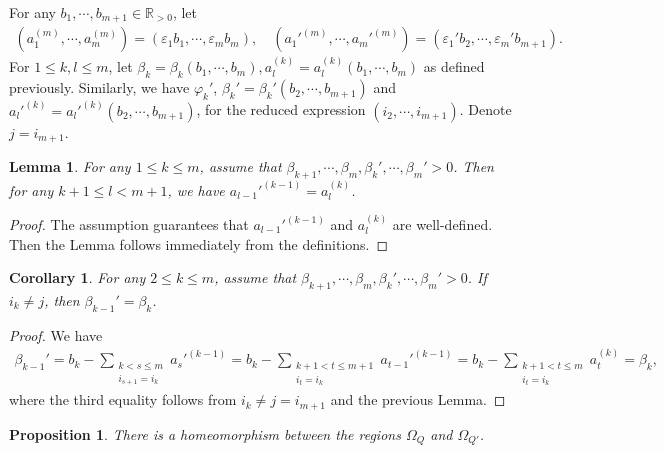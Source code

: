 \documentclass[12pt]{amsart}
\newtheorem{lemma}[theorem]{Lemma}
\newtheorem{corollary}[theorem]{Corollary}
\newtheorem{proposition}[theorem]{Proposition}
\begin{document}
For any $b_1,\cdots,b_{m+1}\in \mathbb{R}_{>0}$, let 
\begin{align*}
    (a_1^{(m)},\cdots,a_m^{(m)})=(\varepsilon_1b_1,\cdots,\varepsilon_mb_m), \quad ({a_1'}^{(m)},\cdots,{a_m'}^{(m)})=(\varepsilon_1'b_2,\cdots,\varepsilon_m'b_{m+1}).
\end{align*}
For $1\leq k,l\leq m$, let $\beta_k=\beta_k(b_1,\cdots,b_m),a_l^{(k)}=a_l^{(k)}(b_1,\cdots,b_m)$ as defined previously.
Similarly, we have $\varphi_k'$, $\beta_k'=\beta_k'(b_2,\cdots,b_{m+1})$ and ${a_l'}^{(k)}={a_l'}^{(k)}(b_2,\cdots,b_{m+1})$, for the reduced expression $(i_2,\cdots,i_{m+1})$.
Denote $j=i_{m+1}$.

\begin{lemma}
    For any $1\leq k \leq m$, assume that $\beta_{k+1},\cdots,\beta_m,\beta_k',\cdots,\beta_m'>0$.
    Then for any $k+1 \leq l < m+1$, we have ${a_{l-1}'}^{(k-1)}=a_l^{(k)}$.
\end{lemma}

\begin{proof}
    The assumption guarantees that ${a_{l-1}'}^{(k-1)}$ and $a_l^{(k)}$ are well-defined. Then the Lemma follows immediately from the definitions.
\end{proof}

\begin{corollary}
    For any $2\leq k \leq m$, assume that $\beta_{k+1},\cdots,\beta_m,\beta_k',\cdots,\beta_m'>0$.
    If $i_k\neq j$, then $\beta_{k-1}'=\beta_k$.
\end{corollary}

\begin{proof}
    We have 
    \begin{align*}
        \beta_{k-1}'
        = b_k-\sum_{\substack{k<s\leq m \\ i_{s+1}=i_k}} {a_s'}^{(k-1)}
        = b_k-\sum_{\substack{k+1< t \leq m+1 \\ i_t=i_k}} {a_{t-1}'}^{(k-1)}
        = b_k-\sum_{\substack{k+1< t \leq m \\ i_t=i_k}} a_{t}^{(k)} = \beta_k,
    \end{align*}
    where the third equality follows from $i_k\neq j=i_{m+1}$ and the previous Lemma.
\end{proof}

\begin{proposition}\label{Omega}
    There is a homeomorphism between the regions $\Omega_Q$ and $\Omega_{Q'}$.
\end{proposition}
\end{document}
